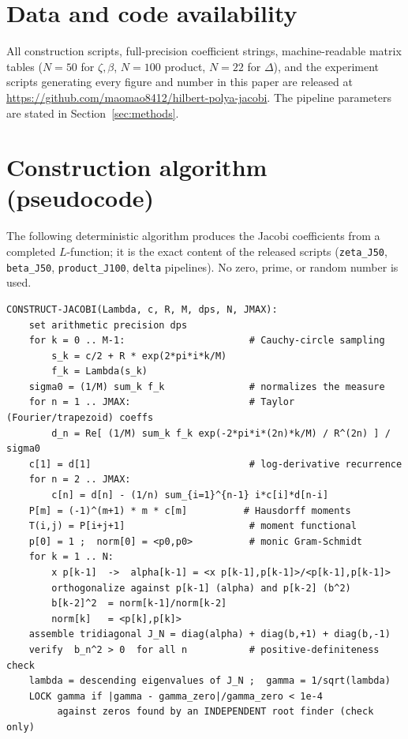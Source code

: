 \documentclass[aps,prx,reprint,floatfix]{revtex4-2}
\begin{document}
\section*{Data and code availability}
All construction scripts, full-precision coefficient strings, machine-readable
matrix tables ($N=50$ for $\zeta,\beta$, $N=100$ product, $N=22$ for
$\Delta$), and the experiment scripts generating every figure and number in
this paper are released at
\url{https://github.com/maomao8412/hilbert-polya-jacobi}. The pipeline
parameters are stated in Section~\ref{sec:methods}.

\appendix

\section{Construction algorithm (pseudocode)}
\label{app:algo}
The following deterministic algorithm produces the Jacobi coefficients from a
completed $L$-function; it is the exact content of the released scripts
(\texttt{zeta\_J50}, \texttt{beta\_J50}, \texttt{product\_J100},
\texttt{delta} pipelines). No zero, prime, or random number is used.

\begin{table}[t]
\centering
\footnotesize
\caption{Deterministic construction pipeline (pseudocode). The exact scripts (\texttt{zeta\_J50}, \texttt{beta\_J50}, \texttt{product\_J100}, \texttt{delta} pipelines) are released with this work; no zero, prime, or random number is used.}
\label{alg:construct}
\begin{verbatim}
CONSTRUCT-JACOBI(Lambda, c, R, M, dps, N, JMAX):
    set arithmetic precision dps
    for k = 0 .. M-1:                      # Cauchy-circle sampling
        s_k = c/2 + R * exp(2*pi*i*k/M)
        f_k = Lambda(s_k)
    sigma0 = (1/M) sum_k f_k               # normalizes the measure
    for n = 1 .. JMAX:                     # Taylor (Fourier/trapezoid) coeffs
        d_n = Re[ (1/M) sum_k f_k exp(-2*pi*i*(2n)*k/M) / R^(2n) ] / sigma0
    c[1] = d[1]                            # log-derivative recurrence
    for n = 2 .. JMAX:
        c[n] = d[n] - (1/n) sum_{i=1}^{n-1} i*c[i]*d[n-i]
    P[m] = (-1)^(m+1) * m * c[m]          # Hausdorff moments
    T(i,j) = P[i+j+1]                      # moment functional
    p[0] = 1 ;  norm[0] = <p0,p0>          # monic Gram-Schmidt
    for k = 1 .. N:
        x p[k-1]  ->  alpha[k-1] = <x p[k-1],p[k-1]>/<p[k-1],p[k-1]>
        orthogonalize against p[k-1] (alpha) and p[k-2] (b^2)
        b[k-2]^2  = norm[k-1]/norm[k-2]
        norm[k]   = <p[k],p[k]>
    assemble tridiagonal J_N = diag(alpha) + diag(b,+1) + diag(b,-1)
    verify  b_n^2 > 0  for all n           # positive-definiteness check
    lambda = descending eigenvalues of J_N ;  gamma = 1/sqrt(lambda)
    LOCK gamma if |gamma - gamma_zero|/gamma_zero < 1e-4
         against zeros found by an INDEPENDENT root finder (check only)
\end{verbatim}
\end{table}
\end{document}
